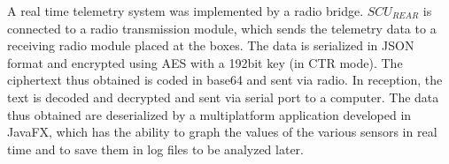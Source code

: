 A real time telemetry system was implemented by a radio bridge. $SCU_{REAR}$ is connected to a radio transmission module, which sends the telemetry data to a receiving radio module placed at the boxes. The data is serialized in J\+S\+ON format and encrypted using A\+ES with a 192bit key (in C\+TR mode). The ciphertext thus obtained is coded in base64 and sent via radio. In reception, the text is decoded and decrypted and sent via serial port to a computer. The data thus obtained are deserialized by a multiplatform application developed in Java\+FX, which has the ability to graph the values of the various sensors in real time and to save them in log files to be analyzed later. 
